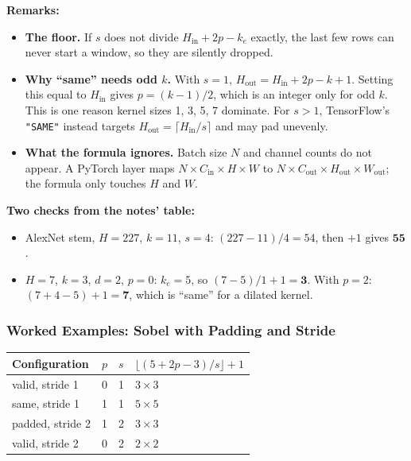 \textbf{Remarks:}
\begin{itemize}
  \item \textbf{The floor.} If $s$ does not divide $H_{\text{in}}+2p-k_e$ exactly, the last few rows can never start a window, so they are silently dropped.
  \item \textbf{Why ``same'' needs odd $k$.} With $s=1$, $H_{\text{out}}=H_{\text{in}}+2p-k+1$. Setting this equal to $H_{\text{in}}$ gives $p=(k-1)/2$, which is an integer only for odd $k$. This is one reason kernel sizes 1, 3, 5, 7 dominate. For $s>1$, TensorFlow's \texttt{"SAME"} instead targets $H_{\text{out}}=\lceil H_{\text{in}}/s\rceil$ and may pad unevenly.
  \item \textbf{What the formula ignores.} Batch size $N$ and channel counts do not appear. A PyTorch layer maps $N\times C_{\text{in}}\times H\times W$ to $N\times C_{\text{out}}\times H_{\text{out}}\times W_{\text{out}}$; the formula only touches $H$ and $W$.
\end{itemize}

\textbf{Two checks from the notes' table:}
\begin{itemize}
  \item AlexNet stem, $H=227$, $k=11$, $s=4$: $(227-11)/4=54$, then $+1$ gives $\mathbf{55}$.
  \item $H=7$, $k=3$, $d=2$, $p=0$: $k_e=5$, so $(7-5)/1+1=\mathbf{3}$. With $p=2$: $(7+4-5)+1=\mathbf{7}$, which is ``same'' for a dilated kernel.
\end{itemize}

\subsubsection*{Worked Examples: Sobel with Padding and Stride}

\begin{center}
\begin{tabular}{llll}
\toprule
Configuration & $p$ & $s$ & $\lfloor(5+2p-3)/s\rfloor+1$\\
\midrule
valid, stride 1 & 0 & 1 & $3\times3$\\
same, stride 1 & 1 & 1 & $5\times5$\\
padded, stride 2 & 1 & 2 & $3\times3$\\
valid, stride 2 & 0 & 2 & $2\times2$\\
\bottomrule
\end{tabular}
\end{center}

